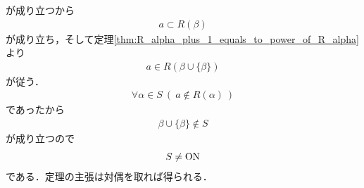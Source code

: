 \begin{prf}
		が成り立つから
		\begin{align}
			a \subset R(\beta)
		\end{align}
		が成り立ち，そして定理\ref{thm:R_alpha_plus_1_equals_to_power_of_R_alpha}より
		\begin{align}
			a \in R\left(\beta \cup \{\beta\}\right)
		\end{align}
		が従う．
		\begin{align}
			\forall \alpha \in S\ (\ a \notin R(\alpha)\ )
		\end{align}
		であったから
		\begin{align}
			\beta \cup \{\beta\} \notin S
		\end{align}
		が成り立つので
		\begin{align}
			S \neq \mathrm{ON}
		\end{align}
		である．定理の主張は対偶を取れば得られる．
		\QED
	\end{prf}
	
	\begin{screen}
		\begin{dfn}[集合の階数]
		\end{dfn}
	\end{screen}